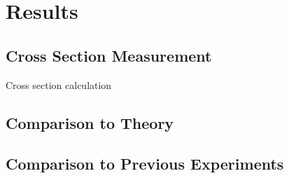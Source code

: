 \chapter{Results}
\section{Cross Section Measurement}
Cross section calculation 
\section{Comparison to Theory}
\section{Comparison to Previous Experiments}

